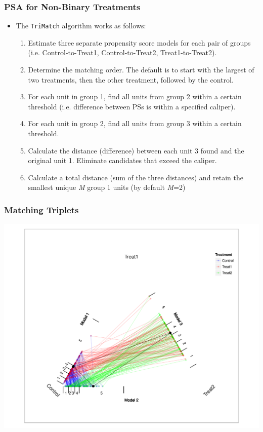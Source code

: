 \documentclass[10pt,slidestop,mathserif,c]{beamer}
\begin{document}
\begin{frame}
    \frametitle{PSA for Non-Binary Treatments}
    \begin{itemize}
        \item The \texttt{TriMatch} algorithm works as follows:
        \begin{enumerate}
            \item Estimate three separate propensity score models for each pair of groups (i.e. Control-to-Treat1, Control-to-Treat2, Treat1-to-Treat2).
            \item Determine the matching order. The default is to start with the largest of two treatments, then the other treatment, followed by the control.
            \item For each unit in group 1, find all units from group 2 within a certain threshold (i.e. difference between PSs is within a specified caliper).
            \item For each unit in group 2, find all units from group 3 within a certain threshold.
            \item Calculate the distance (difference) between each unit 3 found and the original unit 1. Eliminate candidates that exceed the caliper.
            \item Calculate a total distance (sum of the three distances) and retain the smallest unique \textit{M} group 1 units (by default \textit{M}=2)
        \end{enumerate}
    \end{itemize}
\end{frame}


\begin{frame}
    \frametitle{Matching Triplets} 
\begin{center}
    \includegraphics{figures/Slides-triangleplot}
\end{center}

\end{frame}
\end{document}
